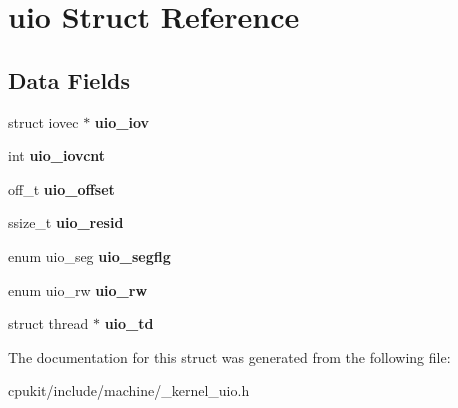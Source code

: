 \hypertarget{structuio}{}\section{uio Struct Reference}
\label{structuio}
\subsection*{Data Fields}
\begin{DoxyCompactItemize}
\item 
\mbox{\label{structuio_a9ff801108e1c020a0225d3d5e9c72dbc}} 
struct iovec $\ast$ {\bfseries uio\+\_\+iov}
\item 
\mbox{\label{structuio_ac1ad640302b4470e557f16bc1f04496a}} 
int {\bfseries uio\+\_\+iovcnt}
\item 
\mbox{\label{structuio_a8a27af75487c864e26cf4256abbc87ca}} 
off\+\_\+t {\bfseries uio\+\_\+offset}
\item 
\mbox{\label{structuio_a0054db2b6a996e5ac5f2b8d09561bd93}} 
ssize\+\_\+t {\bfseries uio\+\_\+resid}
\item 
\mbox{\label{structuio_ab470c4ff9ffa50003161f02a04b0e375}} 
enum uio\+\_\+seg {\bfseries uio\+\_\+segflg}
\item 
\mbox{\label{structuio_a9ebf0bd8d2465e8965829bbcf47bdf19}} 
enum uio\+\_\+rw {\bfseries uio\+\_\+rw}
\item 
\mbox{\label{structuio_a53a2d4daf9fa6f54d9d3403ee7c9c58b}} 
struct thread $\ast$ {\bfseries uio\+\_\+td}
\end{DoxyCompactItemize}


The documentation for this struct was generated from the following file\+:\begin{DoxyCompactItemize}
\item 
cpukit/include/machine/\+\_\+kernel\+\_\+uio.\+h\end{DoxyCompactItemize}
